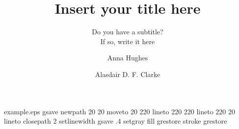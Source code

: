 %
%
%
%
%
\begin{filecontents*}{example.eps}
gsave
newpath
  20 20 moveto
  20 220 lineto
  220 220 lineto
  220 20 lineto
closepath
2 setlinewidth
gsave
  .4 setgray fill
grestore
stroke
grestore
\end{filecontents*}
%
\RequirePackage{fix-cm}
%
\documentclass[smallextended]{svjour3}       %
%
\smartqed  %
%
\usepackage{graphicx}
%
%
%
%
%


\title{Insert your title here%
}
\subtitle{Do you have a subtitle?\\ If so, write it here}


\author{Anna Hughes         \and
        Alasdair D. F. Clarke
}



